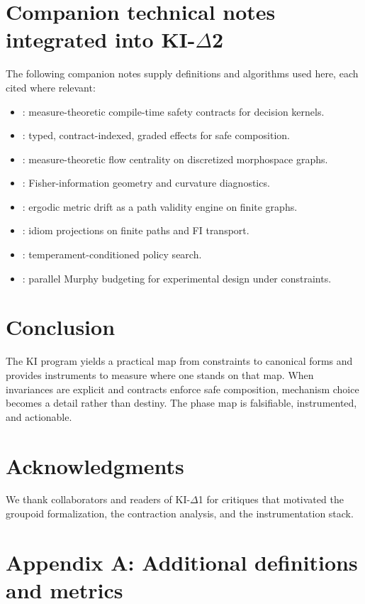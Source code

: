 \documentclass[11pt]{article}
\newcommand{\1}{\mathbbm{1}}
\begin{document}
\section{Companion technical notes integrated into KI-$\Delta$2}
The following companion notes supply definitions and algorithms used here, each cited where relevant:
\begin{itemize}[leftmargin=2em]
    \item \textcite{MeasureContracts}: measure-theoretic compile-time safety contracts for decision kernels.
    \item \textcite{GradedEffects}: typed, contract-indexed, graded effects for safe composition.
    \item \textcite{FlowCentrality}: measure-theoretic flow centrality on discretized morphospace graphs.
    \item \textcite{FICurvature}: Fisher-information geometry and curvature diagnostics.
    \item \textcite{DriftValidity}: ergodic metric drift as a path validity engine on finite graphs.
    \item \textcite{IdiomProj}: idiom projections on finite paths and FI transport.
    \item \textcite{TCPS}: temperament-conditioned policy search.
    \item \textcite{MurphyBudgeting}: parallel Murphy budgeting for experimental design under constraints.
\end{itemize}

\section{Conclusion}
The KI program yields a practical map from constraints to canonical forms and provides instruments to measure where one stands on that map. When invariances are explicit and contracts enforce safe composition, mechanism choice becomes a detail rather than destiny. The phase map is falsifiable, instrumented, and actionable.

\section*{Acknowledgments}
We thank collaborators and readers of KI-$\Delta$1 for critiques that motivated the groupoid formalization, the contraction analysis, and the instrumentation stack.

\appendix

\section{Appendix A: Additional definitions and metrics}
\end{document}
